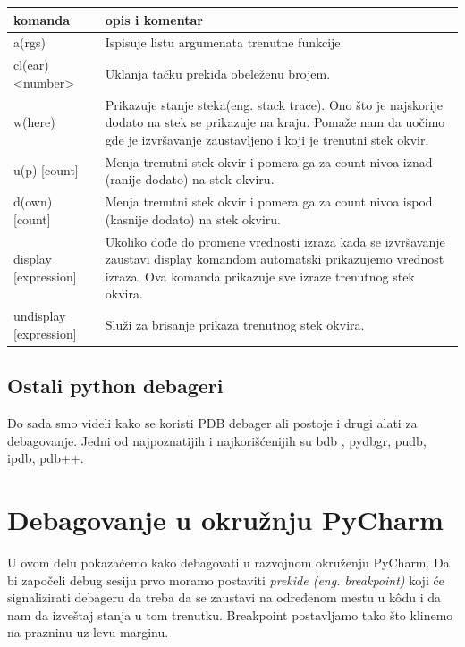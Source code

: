 \documentclass[a4paper]{article}
\begin{document}
\begin{center}
 \begin{tabular}{||p{3cm} p{7cm}||} 
 \hline
  komanda &      opis i komentar \\ [2.0ex] 
 \hline\hline
  a(rgs) & Ispisuje listu argumenata trenutne funkcije.  \\  [2ex]   
 \hline
 cl(ear) <number> & Uklanja tačku prekida obeleženu brojem.  \\ [2ex]
 \hline
 w(here) & Prikazuje stanje steka(eng. stack trace). Ono što je najskorije dodato na stek se prikazuje na kraju. Pomaže nam da uočimo gde je izvršavanje zaustavljeno i koji je trenutni stek okvir. \\ [2ex]
 \hline
 u(p) [count] & Menja trenutni stek okvir i pomera ga za count nivoa iznad (ranije dodato) na stek okviru.  \\ [2ex]
  \hline
 d(own) [count] & Menja trenutni stek okvir i pomera ga za count nivoa ispod (kasnije dodato) na stek okviru.  \\ [2ex] 
 \hline
  \hline
 display [expression] & Ukoliko dođe do promene vrednosti izraza kada se izvršavanje zaustavi display komandom automatski prikazujemo vrednost izraza. Ova komanda prikazuje sve izraze trenutnog stek okvira.\\ [2ex] 
 \hline
 \hline
 undisplay [expression] & Služi za brisanje prikaza trenutnog stek okvira.  \\ [2ex] 
 \hline
\end{tabular}
\end{center}

\subsection{Ostali python debageri}
Do sada smo videli kako se koristi PDB debager ali postoje i drugi alati za debagovanje. Jedni od najpoznatijih i najkorišćenijih su bdb \cite{bdbDocPyt}, pydbgr, pudb, ipdb, pdb++.


\section{Debagovanje u okružnju PyCharm}
U ovom delu pokazaćemo kako debagovati u razvojnom okruženju PyCharm. Da bi započeli debug sesiju prvo moramo postaviti \emph{prekide (eng. breakpoint)} koji će signalizirati debageru  da treba da se zaustavi na određenom mestu u k\^{o}du i da nam da izveštaj stanja u tom trenutku. Breakpoint postavljamo tako što klinemo na prazninu uz levu marginu.
\end{document}
